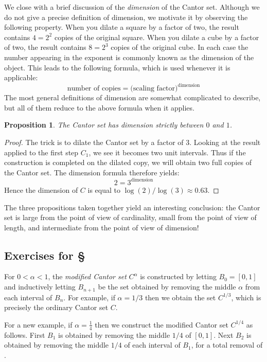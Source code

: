 \documentclass[11pt,oneside]{amsbook}
\theoremstyle{definition}
\theoremstyle{plain}
\newtheorem{prop}[thm]{Proposition}
\theoremstyle{definition}
\theoremstyle{remark}
\numberwithin{equation}{section}
\numberwithin{figure}{section}
\begin{document}
We close with a brief discussion of the \emph{dimension} of the Cantor set. Although we do not give a precise definition of dimension, we motivate it by observing the following property. When you dilate a square by a factor of two, the result contains $4=2^2$ copies of the original square. When you dilate a cube by a factor of two, the result contains $8=2^3$ copies of the original cube. In each case the number appearing in the exponent is commonly known as the dimension of the object. This leads to the following formula, which is used whenever it is applicable:
\[\text{number of copies}=\text{(scaling factor)}^\text{dimension}
\]
The most general definitions of dimension are somewhat complicated to describe, but all of them reduce to the above formula when it applies.

\begin{prop}
  The Cantor set has dimension strictly between $0$ and $1$.
\end{prop}

\begin{proof}
  The trick is to dilate the Cantor set by a factor of $3$. Looking at the result applied to the first step $C_1$, we see it becomes two unit intervals. Thus if the construction is completed on the dilated copy, we will obtain two full copies of the Cantor set. The dimension formula therefore yields:
\[2=3^{\text{dimension}}
\]
Hence the dimension of $C$ is equal to $\log(2)/\log(3)\approx0.63$.
\end{proof}

The three propositions taken together yield an interesting conclusion: the Cantor set is large from the point of view of cardinality, small from the point of view of length, and intermediate from the point of view of dimension!

\newpage
\subsection*{Exercises for \S \thesection}

For $0<\alpha<1$, the \emph{modified Cantor set} $C^\alpha$ is constructed by letting $B_0=[0,1]$ and inductively letting $B_{n+1}$ be the set obtained by removing the middle $\alpha$ from each interval of $B_n$. For example, if $\alpha=1/3$ then we obtain the set $C^{1/3}$, which is precisely the ordinary Cantor set $C$.

For a new example, if $\alpha=\frac14$ then we construct the modified Cantor set $C^{1/4}$ as follows. First $B_1$ is obtained by removing the middle $1/4$ of $[0,1]$. Next $B_2$ is obtained by removing the middle $1/4$ of each interval of $B_1$, for a total removal of \underline{\hspace{1in}}.
\end{document}
